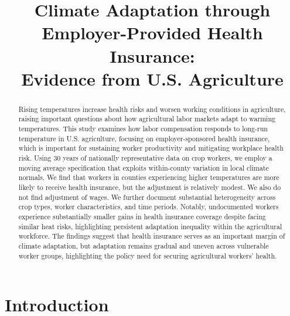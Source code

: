 \documentclass[12pt]{article}
\title{Climate Adaptation through Employer-Provided Health Insurance: \\ Evidence from U.S. Agriculture}
\author{}
\begin{document}
\maketitle

\begin{abstract}
\noindent Rising temperatures increase health risks and worsen working conditions in agriculture, raising important questions about how agricultural labor markets adapt to warming temperatures. This study examines how labor compensation responds to long-run temperature in U.S. agriculture, focusing on employer-sponsored health insurance, which is important for sustaining worker productivity and mitigating workplace health risk. Using 30 years of nationally representative data on crop workers, we employ a moving average specification that exploits within-county variation in local climate normals. We find that workers in counties experiencing higher temperatures are more likely to receive health insurance, but the adjustment is relatively modest. We also do not find adjustment of wages. We further document substantial heterogeneity across crop types, worker characteristics, and time periods. Notably, undocumented workers experience substantially smaller gains in health insurance coverage despite facing similar heat risks, highlighting persistent adaptation inequality within the agricultural workforce. The findings suggest that health insurance serves as an important margin of climate adaptation, but adaptation remains gradual and uneven across vulnerable worker groups, highlighting the policy need for securing agricultural workers' health.
\end{abstract}

\clearpage
\tableofcontents

\clearpage
\section{Introduction}
\end{document}
